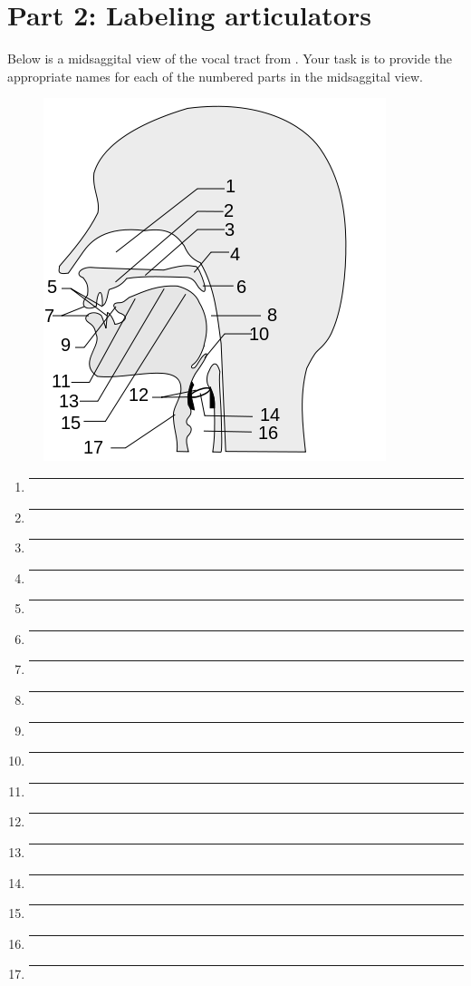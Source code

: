 \documentclass[12pt, letterpaper]{article}
\begin{document}
\section*{Part 2: Labeling articulators} \label{sec:labelingarticulators}

Below is a midsaggital view of the vocal tract from \citet{forinashSoundInteractiveEBook2025}. Your task is to provide the appropriate names for each of the numbered parts in the midsaggital view. 
\begin{figure}[!h]
    \centering
    \includegraphics[width = .75\linewidth]{figs/VocalTract_Labeling.png}
\end{figure}

\begin{multicols}{2}
    \begin{enumerate}
        \setlength{\itemsep}{1em}
        \item \rule{5cm}{0.4pt}
        \item \rule{5cm}{0.4pt}
        \item \rule{5cm}{0.4pt}
        \item \rule{5cm}{0.4pt}
        \item \rule{5cm}{0.4pt}
        \item \rule{5cm}{0.4pt}
        \item \rule{5cm}{0.4pt}
        \item \rule{5cm}{0.4pt}
        \columnbreak
        \item \rule{5cm}{0.4pt}
        \item \rule{5cm}{0.4pt}
        \item \rule{5cm}{0.4pt}
        \item \rule{5cm}{0.4pt}
        \item \rule{5cm}{0.4pt}
        \item \rule{5cm}{0.4pt}
        \item \rule{5cm}{0.4pt}
        \item \rule{5cm}{0.4pt}
        \item \rule{5cm}{0.4pt}
    \end{enumerate}
\end{multicols}
\end{document}
